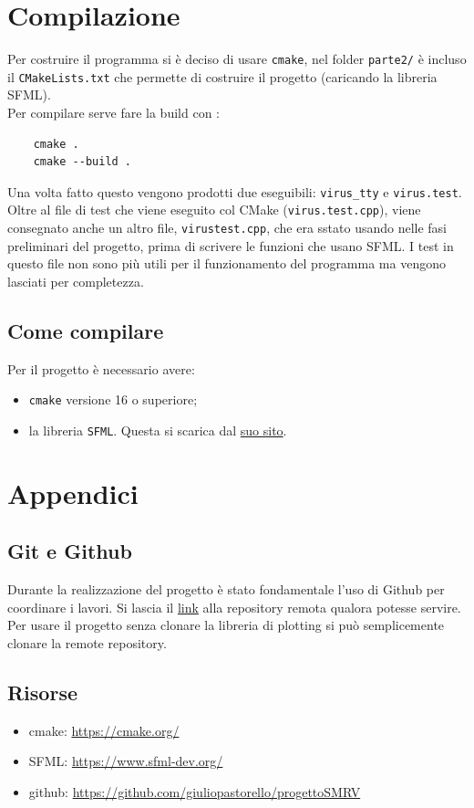 \documentclass{article}
\begin{document}
\section{Compilazione}
\hspace{\parindent} Per costruire il programma si è deciso di usare 
\verb|cmake|, nel folder \verb|parte2/| è incluso il 
\verb|CMakeLists.txt| che permette di costruire il progetto 
(caricando la libreria SFML).\\
Per compilare serve fare la build con :
\begin{verbatim}
    cmake .  
    cmake --build .
\end{verbatim} 
Una volta fatto questo vengono prodotti due
eseguibili: \verb|virus_tty| e \verb|virus.test|. Oltre al file di test che viene
eseguito col CMake (\verb|virus.test.cpp|), viene consegnato anche un altro
file, \verb|virustest.cpp|, che era sstato usando nelle fasi preliminari del
progetto, prima di scrivere le funzioni che usano SFML. I test in questo file
non sono più utili per il funzionamento del programma ma vengono lasciati per 
completezza.
\subsection{Come compilare}
Per il progetto è necessario avere:
\begin{itemize}
    \item \verb|cmake| versione 16 o superiore;
    \item la libreria \verb|SFML|. Questa si scarica dal 
    \href{https://www.sfml-dev.org/}{suo sito}.
\end{itemize}
\section{Appendici}
\subsection{Git e Github}
Durante la realizzazione del progetto è stato fondamentale l'uso di 
Github per coordinare i lavori. Si lascia il 
\href{https://github.com/giuliopastorello/progetto_SMRV}{link} alla 
repository remota qualora potesse servire. Per usare il progetto senza
clonare la libreria di plotting si può semplicemente clonare la 
remote repository.
\subsection{Risorse}
\begin{itemize}
    \item cmake: \href{https://cmake.org/}{https://cmake.org/}
    \item SFML: \href{https://www.sfml-dev.org/}{https://www.sfml-dev.org/}
    \item github: \href{https://github.com/giuliopastorello/progetto_SMRV}{https://github.com/giuliopastorello/progettoSMRV}
\end{itemize}   
\end{document}
